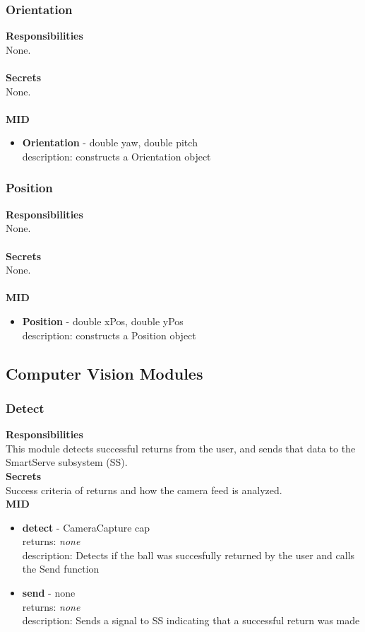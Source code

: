 \documentclass[11pt]{article}
\begin{document}
\subsubsection*{Orientation}
\textbf{Responsibilities} \\
None. \\ \\
\textbf{Secrets} \\
None. \\ \\
\textbf{MID}
\begin{itemize}
\item \textbf{Orientation} - double yaw, double pitch \\ description: constructs a Orientation object
\end{itemize}

\subsubsection*{Position}
\textbf{Responsibilities} \\
None. \\ \\
\textbf{Secrets} \\
None. \\ \\
\textbf{MID}
\begin{itemize}
\item \textbf{Position} - double xPos, double yPos \\ description: constructs a Position object
\end{itemize}

\subsection{Computer Vision Modules}
\subsubsection*{Detect}
\textbf{Responsibilities} \\
This module detects successful returns from the user, and sends that data to the SmartServe subsystem (SS).\\
\textbf{Secrets} \\ 
Success criteria of returns and how the camera feed is analyzed.\\ 
\textbf{MID} 
\begin{itemize}
\item \textbf{detect} - CameraCapture cap \\ returns: \textit{none} \\ description: Detects if the ball was succesfully returned by the user and calls the Send function
\item \textbf{send} - none \\ returns: \textit{none} \\ description: Sends a signal to SS indicating that a successful return was made
\end{itemize}
\end{document}
